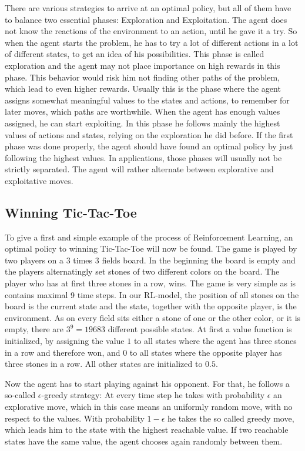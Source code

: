 \documentclass[paper=a4, fontsize=11pt]{scrartcl} %
\numberwithin{equation}{section} %
\numberwithin{figure}{section} %
\numberwithin{table}{section} %
\begin{document}
	There are various strategies to arrive at an optimal policy, but all of them have to balance two essential phases: Exploration and Exploitation. The agent does not know the reactions of the environment to an action, until he gave it a try. So when the agent starts the problem, he has to try a lot of different actions in a lot of different states, to get an idea of his possibilities. This phase is called exploration and the agent may not place importance on high rewards in this phase. This behavior would risk him not finding other paths of the problem, which lead to even higher rewards. Usually this is the phase where the agent assigns somewhat meaningful values to the states and actions, to remember for later moves, which paths are worthwhile. When the agent has enough values assigned, he can start exploiting. In this phase he follows mainly the highest values of actions and states, relying on the exploration he did before. If the first phase was done properly, the agent should have found an optimal policy by just following the highest values. In applications, those phases will usually not be strictly separated. The agent will rather alternate between explorative and exploitative moves.

\subsection{Winning Tic-Tac-Toe}

	To give a first and simple example of the process of Reinforcement Learning, an optimal policy to winning Tic-Tac-Toe will now be found. The game is played by two players on a 3 times 3 fields board. In the beginning the board is empty and the players alternatingly set stones of two different colors on the board. The player who has at first three stones in a row, wins. The game is very simple as is contains maximal 9 time steps. In our RL-model, the position of all stones on the board is the current state and the state, together with the opposite player, is the environment. As on every field sits either a stone of one or the other color, or it is empty, there are $3^9 = 19683$ different possible states. At first a value function is initialized, by assigning the value $1$ to all states where the agent has three stones in a row and therefore won, and $0$ to all states where the opposite player has three stones in a row. All other states are initialized to $0.5$. 

	Now the agent has to start playing against his opponent. For that, he follows a so-called $\epsilon$-greedy strategy: At every time step he takes with probability $\epsilon$ an explorative move, which in this case means an uniformly random move, with no respect to the values. With probability $1-\epsilon$ he takes the so called greedy move, which leads him to the state with the highest reachable value. If two reachable states have the same value, the agent chooses again randomly between them. 
\end{document}
